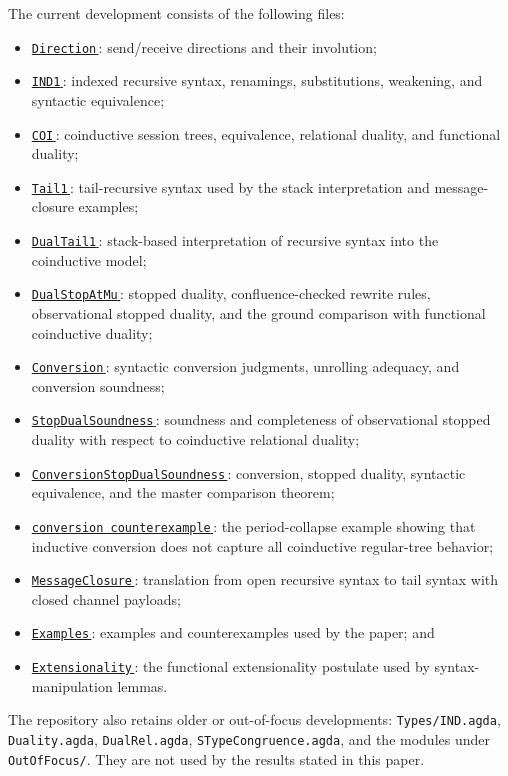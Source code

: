 \documentclass[submission,copyright,creativecommons]{eptcs}
\newcommand{\AgdaHen}{}
\newcommand{\AgdaLink}[2]{\href{src/#1}{\mbox{\texttt{#2}\,\AgdaHen}}}
\newcommand{\AgdaFile}[2]{\AgdaLink{#1.html}{#2}}
\begin{document}
The current development consists of the following files:
\begin{itemize}
\item \AgdaFile{Types.Direction}{Direction}: send/receive
  directions and their involution;
\item \AgdaFile{Types.IND1}{IND1}: indexed recursive syntax,
  renamings, substitutions, weakening, and syntactic equivalence;
\item \AgdaFile{Types.COI}{COI}: coinductive session trees,
  equivalence, relational duality, and functional duality;
\item \AgdaFile{Types.Tail1}{Tail1}: tail-recursive syntax used by
  the stack interpretation and message-closure examples;
\item \AgdaFile{DualTail1}{DualTail1}: stack-based interpretation of
  recursive syntax into the coinductive model;
\item \AgdaFile{DualStopAtMu}{DualStopAtMu}: stopped duality,
  confluence-checked rewrite rules, observational stopped duality, and the
  ground comparison with functional coinductive duality;
\item \AgdaFile{Conversion}{Conversion}: syntactic conversion judgments,
  unrolling adequacy, and conversion soundness;
\item \AgdaFile{StopDualSoundness}{StopDualSoundness}: soundness and
  completeness of observational stopped duality with respect to coinductive
  relational duality;
\item \AgdaFile{ConversionStopDualSoundness}{ConversionStopDualSoundness}:
  conversion, stopped duality, syntactic equivalence, and the master
  comparison theorem;
\item \AgdaFile{ConversionCompletenessCounterexample}
  {conversion counterexample}: the period-collapse example
  showing that inductive conversion does not capture all coinductive
  regular-tree behavior;
\item \AgdaFile{MessageClosure}{MessageClosure}: translation from open
  recursive syntax to tail syntax with closed channel payloads;
\item \AgdaFile{Examples}{Examples}: examples and counterexamples used by
  the paper; and
\item \AgdaFile{Auxiliary.Extensionality}{Extensionality}: the
  functional extensionality postulate used by syntax-manipulation lemmas.
\end{itemize}

The repository also retains older or out-of-focus developments:
\texttt{Types/IND.agda}, \texttt{Duality.agda}, \texttt{DualRel.agda},
\texttt{STypeCongruence.agda}, and the modules under \texttt{OutOfFocus/}.
They are not used by the results stated in this paper.
\end{document}
